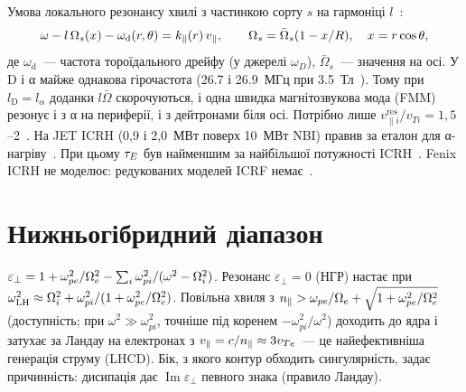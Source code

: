 Умова локального резонансу хвилі з частинкою сорту $s$ на гармоніці $l$~\cite[с.~87--88, (4.1)]{Tyshchenko2021}:
\begin{equation}\label{eq:10-res}
  \omega-l\,\Omega_{s}(x)-\omega_{\mathrm d}(r,\theta)=k_{\parallel}(r)\,v_\parallel,\qquad \Omega_{s}=\bar\Omega_s(1-x/R),\quad x=r\cos\theta,
\end{equation}
де $\omega_{\mathrm d}$~--- частота тороїдального дрейфу (у джерелі $\omega_D$), $\bar\Omega_s$~--- значення на осі. У D і α майже однакова гірочастота (\num{26,7} і \SI{26,9}{МГц} при \SI{3,5}{Тл}~\cite[с.~89]{Tyshchenko2021}). Тому при $l_{\mathrm D}=l_\alpha$ доданки $l\bar\Omega$ скорочуються, і одна швидка магнітозвукова мода (FMM) резонує і з α на периферії, і з дейтронами біля осі. Потрібно лише $v_{\parallel i}^{\mathrm{res}}/v_{Ti}=1{,}5$--2~\cite[с.~89--91]{Tyshchenko2021}. На JET ICRH (0,9 і 2,0~МВт поверх 10~МВт NBI) правив за еталон для α-нагріву~\cite[с.~86, табл.~4.1]{Tyshchenko2021}. При цьому $\tau_{E}$ був найменшим за найбільшої потужності ICRH~\cite[с.~116]{Tyshchenko2021}. Fenix ICRH не моделює: редукованих моделей ICRF немає~\cite[с.~4--5]{Fable2022}.

\section{Нижньогібридний діапазон}\label{sec:10-lh}

\begin{outofcorpus}
$\varepsilon_\perp=1+\omega_{pe}^2/\Omega_{e}^2-\sum_i\omega_{pi}^2/(\omega^2-\Omega_{i}^2)$. Резонанс $\varepsilon_\perp=0$ (НГР) настає при $\omega_{\mathrm{LH}}^2\approx\Omega_{i}^2+\omega_{pi}^2/(1+\omega_{pe}^2/\Omega_{e}^2)$. Повільна хвиля з $n_{\parallel}>\omega_{pe}/\Omega_{e}+\sqrt{1+\omega_{pe}^2/\Omega_{e}^2}$ (доступність; при $\omega^2\gg\omega_{pi}^2$, точніше під коренем $-\omega_{pi}^2/\omega^2$) доходить до ядра і затухає за Ландау на електронах з $v_\parallel=c/n_{\parallel}\approx3v_{Te}$~--- це найефективніша генерація струму (LHCD). Бік, з якого контур обходить сингулярність, задає причинність: дисипація дає $\operatorname{Im}\varepsilon_\perp$ певного знака (правило Ландау).
\end{outofcorpus}

